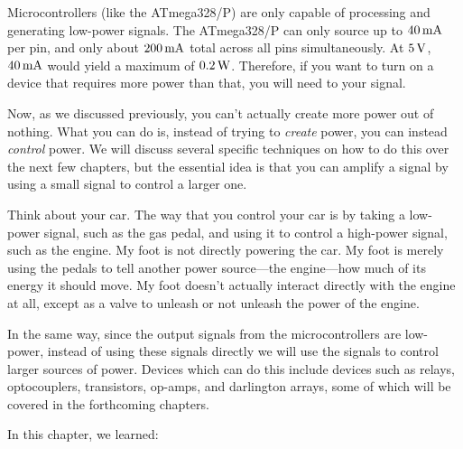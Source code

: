 Microcontrollers (like the ATmega328/P) are only capable of processing and generating low-power signals.
The ATmega328/P can only source up to $40\,\si{\milli\ampere}$ per pin, and only about $200\,\si{\milli\ampere}$ total across all pins simultaneously.
At $5\,\si{\volt}$, $40\,\si{\milli\ampere}$ would yield a maximum of $0.2\,\si{\watt}$.
Therefore, if you want to turn on a device that requires more power than that, you will need to  your signal.

Now, as we discussed previously, you can't actually create more power out of nothing.
What you can do is, instead of trying to \emph{create} power, you can instead \emph{control} power.
We will discuss several specific techniques on how to do this over the next few chapters, but the essential idea is that you can amplify a signal by using a small signal to control a larger one.

Think about your car.
The way that you control your car is by taking a low-power signal, such as the gas pedal, and using it to control a high-power signal, such as the engine.
My foot is not directly powering the car.
My foot is merely using the pedals to tell another power source---the engine---how much of its energy it should move.
My foot doesn't actually interact directly with the engine at all, except as a valve to unleash or not unleash the power of the engine.

In the same way, since the output signals from the microcontrollers are low-power, instead of using these signals directly we will use the signals to control larger sources of power.
Devices which can do this include devices such as relays, optocouplers, transistors, op-amps, and darlington arrays, some of which will be covered in the forthcoming chapters.

\reviewsection

In this chapter, we learned:

